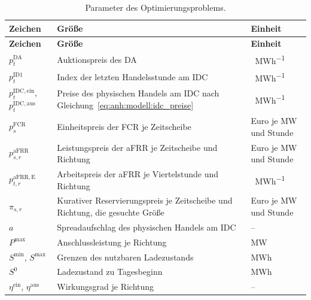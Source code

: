 {\footnotesize\renewcommand{\arraystretch}{1.15}
\begin{longtable}{@{}>{\raggedright\arraybackslash}p{}>{\raggedright\arraybackslash}p{}>{\raggedright\arraybackslash}p{}@{}}
    \caption{Parameter des Optimierungsproblems.}\label{tab:anh:modell:parameter}\\
    \hline
    \textbf{Zeichen} & \textbf{Größe} & \textbf{Einheit} \\
    \hline
    \endfirsthead
    \hline
    \textbf{Zeichen} & \textbf{Größe} & \textbf{Einheit} \\
    \hline
    \endhead
        $p^{\mathrm{DA}}_t$ & Auktionspreis des \acs{DA} & \si{\text{\euro}\per MWh} \\
        \hline
        $p^{\mathrm{ID1}}_t$ & Index der letzten Handelsstunde am \acs{IDC} & \si{\text{\euro}\per MWh} \\
        \hline
        $p^{\mathrm{IDC,ein}}_t$, $p^{\mathrm{IDC,aus}}_t$ & Preise des physischen Handels am \acs{IDC} nach Gleichung~\eqref{eq:anh:modell:idc_preise} & \si{\text{\euro}\per MWh} \\
        \hline
        $p^{\mathrm{FCR}}_{s}$ & Einheitspreis der \acs{FCR} je Zeitscheibe & Euro je \si{MW} und Stunde \\
        \hline
        $p^{\mathrm{aFRR}}_{s,r}$ & Leistungspreis der \acs{aFRR} je Zeitscheibe und Richtung & Euro je \si{MW} und Stunde \\
        \hline
        $p^{\mathrm{aFRR,E}}_{t,r}$ & Arbeitspreis der \acs{aFRR} je Viertelstunde und Richtung & \si{\text{\euro}\per MWh} \\
        \hline
        $\pi_{s,r}$ & Kurativer Reservierungspreis je Zeitscheibe und Richtung, die gesuchte Größe & Euro je \si{MW} und Stunde \\
        \hline
        $a$ & Spreadaufschlag des physischen Handels am \acs{IDC} & -- \\
        \hline
        $P^{\max}$ & Anschlussleistung je Richtung & \si{MW} \\
        \hline
        $S^{\min}$, $S^{\max}$ & Grenzen des nutzbaren Ladezustands & \si{MWh} \\
        \hline
        $S^{0}$ & Ladezustand zu Tagesbeginn & \si{MWh} \\
        \hline
        $\eta^{\mathrm{ein}}$, $\eta^{\mathrm{aus}}$ & Wirkungsgrad je Richtung & -- \\

\end{longtable}}

